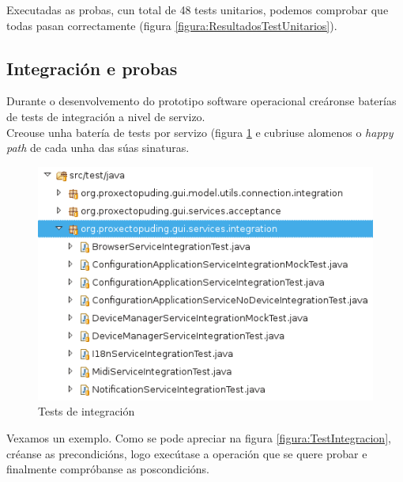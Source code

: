   Executadas as probas, cun total de 48 tests unitarios, podemos comprobar que
  todas pasan correctamente (figura \ref{figura:ResultadosTestUnitarios}).

 \subsection{Integración e probas}
 
 Durante o desenvolvemento do prototipo software operacional creáronse baterías
 de tests de integración a nivel de servizo. \\
 
 Creouse unha batería de tests por servizo (figura \ref{figura:TestsIntegracion}
 e cubriuse alomenos o \textit{happy path} de cada unha das súas sinaturas. \\
  
  \begin{figure}[htbp]
   \centering
   \includegraphics[scale=0.8,keepaspectratio=true]{./imagenes/tests-integracion.png}
   \caption{Tests de integración}
   \label{figura:TestsIntegracion}
  \end{figure}
  
  Vexamos un exemplo. Como se pode apreciar na figura \ref{figura:TestIntegracion},
  créanse as precondicións, logo execútase a operación que se quere probar e
  finalmente compróbanse as poscondicións. \\
  
